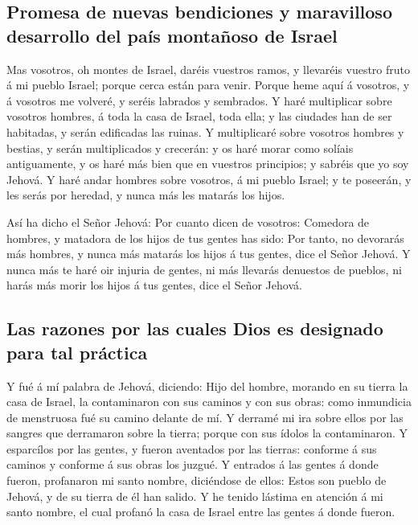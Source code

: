 \hypertarget{promesa-de-nuevas-bendiciones-y-maravilloso-desarrollo-del-pauxeds-montauxf1oso-de-israel}{%
\subsection{Promesa de nuevas bendiciones y maravilloso desarrollo del
país montañoso de
Israel}\label{promesa-de-nuevas-bendiciones-y-maravilloso-desarrollo-del-pauxeds-montauxf1oso-de-israel}}

 Mas vosotros, oh montes de Israel, daréis vuestros ramos, y
llevaréis vuestro fruto á mi pueblo Israel; porque cerca están para
venir.  Porque heme aquí á vosotros, y á vosotros me
volveré, y seréis labrados y sembrados.  Y haré multiplicar
sobre vosotros hombres, á toda la casa de Israel, toda ella; y las
ciudades han de ser habitadas, y serán edificadas las ruinas.
 Y multiplicaré sobre vosotros hombres y bestias, y serán
multiplicados y crecerán: y os haré morar como solíais antiguamente, y
os haré más bien que en vuestros principios; y sabréis que yo soy
Jehová.  Y haré andar hombres sobre vosotros, á mi pueblo
Israel; y te poseerán, y les serás por heredad, y nunca más les matarás
los hijos.

 Así ha dicho el Señor Jehová: Por cuanto dicen de
vosotros: Comedora de hombres, y matadora de los hijos de tus gentes has
sido:  Por tanto, no devorarás más hombres, y nunca más
matarás los hijos á tus gentes, dice el Señor Jehová.  Y
nunca más te haré oir injuria de gentes, ni más llevarás denuestos de
pueblos, ni harás más morir los hijos á tus gentes, dice el Señor
Jehová.

\hypertarget{las-razones-por-las-cuales-dios-es-designado-para-tal-pruxe1ctica}{%
\subsection{Las razones por las cuales Dios es designado para tal
práctica}\label{las-razones-por-las-cuales-dios-es-designado-para-tal-pruxe1ctica}}

 Y fué á mí palabra de Jehová, diciendo:  Hijo
del hombre, morando en su tierra la casa de Israel, la contaminaron con
sus caminos y con sus obras: como inmundicia de menstruosa fué su camino
delante de mí.  Y derramé mi ira sobre ellos por las
sangres que derramaron sobre la tierra; porque con sus ídolos la
contaminaron.  Y esparcílos por las gentes, y fueron
aventados por las tierras: conforme á sus caminos y conforme á sus obras
los juzgué.  Y entrados á las gentes á donde fueron,
profanaron mi santo nombre, diciéndose de ellos: Estos son pueblo de
Jehová, y de su tierra de él han salido.  Y he tenido
lástima en atención á mi santo nombre, el cual profanó la casa de Israel
entre las gentes á donde fueron.

